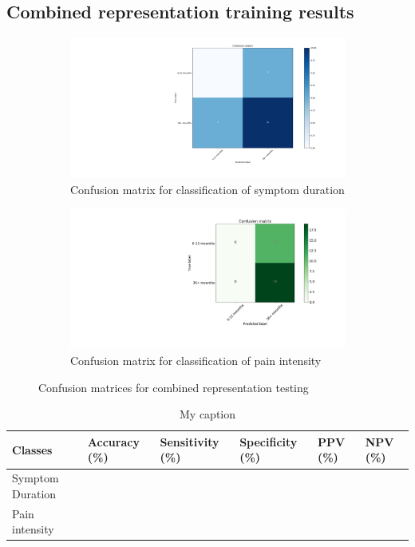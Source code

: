 \documentclass[12pt,a4paper]{article}
\begin{document}
\subsection{Combined representation training results}

\begin{figure}[H]
  \begin{subfigure}[b]{0.45\textwidth}
    \includegraphics[width=\textwidth]{figures/edura2cla}
    \caption{Confusion matrix for classification of symptom duration}
    \label{fig:f1}
  \end{subfigure}
  \hfill
  \begin{subfigure}[b]{0.45\textwidth}
    \includegraphics[width=\textwidth]{figures/epain2cla}
    \caption{Confusion matrix for classification of pain intensity}
    \label{fig:f2}
  \end{subfigure}
  \caption{Confusion matrices for combined representation testing}
\end{figure}



\begin{table}[H]
\centering
\begin{tabular}{|p{2cm}|p{2.2cm}|p{2.2cm}|p{2.2cm}|p{2cm}|p{2cm}|}
\hline
Classes          & Accuracy (\%) & Sensitivity (\%) & Specificity (\%) & PPV (\%) & NPV (\%) \\ \hline
Symptom Duration &                    &                      &                       &               &               \\ \hline
Pain intensity   &                    &                      &                       &               &               \\ \hline
\end{tabular}
\label{my-label}
\caption{My caption}
\end{table}
\end{document}
